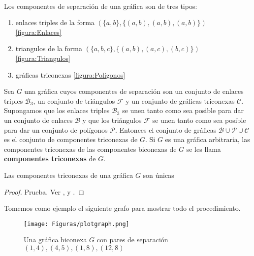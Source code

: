 \paragraph{}
Los componentes de separación de una gráfica son de tres tipos: 
\begin{enumerate}
\item enlaces triples de la forma $\left(\{a, b\}, \{\left(a, b\right),\left(a, b\right),\left(a, b\right)\} \right)$ \ref{figura:Enlaces}
\item triangulos de la forma $\left(\{a, b, c\}, \{\left(a, b\right),\left(a, c\right),\left(b, c\right)\}\right)$ \ref{figura:Triangulos}
\item gráficas triconexas \ref{figura:Poligonos}
\end{enumerate}
Sea $G$ una gráfica cuyos componentes de separación son un conjunto de enlaces triples $\mathscr{B}_{3}$, un conjunto de triángulos $\mathscr{F}$ y un conjunto de gráficas triconexas $\mathscr{C}$. Supongamos que los enlaces triples $\mathscr{B}_{3}$ se unen tanto como sea posible para dar un conjunto de enlaces $\mathscr{B}$ y que los triángulos $\mathscr{F}$ se unen tanto como sea posible para dar un conjunto de polígonos $\mathscr{P}$. Entonces el conjunto de gráficas $ \mathscr{B} \cup \mathscr{P} \cup \mathscr{C}$ es el conjunto de componentes triconexas de $G$. Si $G$ es una gráfica arbitraria, las componentes triconexas de las componentes biconexas de $G$ se les llama \textbf{componentes triconexas} de $G$.

\begin{lemma}
Las componentes triconexas de una gráfica $G$ son únicas
\label{lema:3.2}
\end{lemma}

\begin{proof}
Prueba. Ver \citep{mac-lane-1937}, \citep{jEdmonds} y \citep{tarjan-1972}.
\end{proof}

Tomemos como ejemplo el siguiente grafo para mostrar todo el procedimiento.
\begin{figure}[h]
\centering
\texttt{[image: Figuras/plotgraph.png]}
\caption{Una gráfica biconexa $G$ con pares de separación $(1, 4),(4, 5),(1, 8),(12, 8)$}
\label{figura:3.1}
\end{figure}

